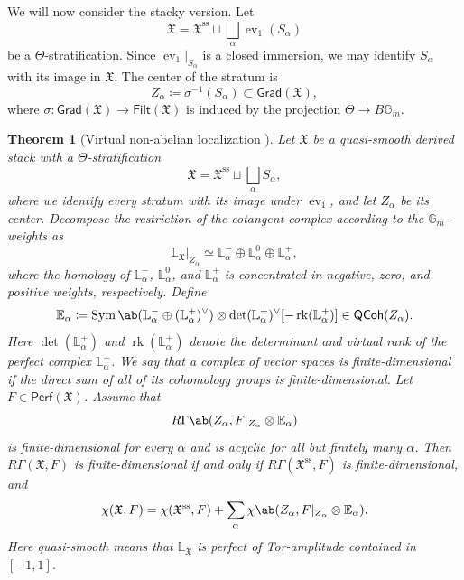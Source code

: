 \documentclass{amsart}
\newtheorem{thm}{Theorem}[section]
\theoremstyle{definition}
\theoremstyle{remark}
\theoremstyle{plain}
\theoremstyle{definition}
\theoremstyle{remark}
\newcommand{\G}{\mathbb{G}}
\newcommand{\E}{\mathbb{E}}
\renewcommand{\L}{\mathbb{L}}
\newcommand{\mf}[1]{\mathfrak{#1}}
\newcommand{\mr}[1]{\mathrm{#1}}
\newcommand{\on}[1]{\operatorname{#1}}
\newcommand{\ms}[1]{\mathsf{#1}}
\newcommand{\1}{\mathbf{1}}
\newcommand{\2}{\mathbf{2}}
\newcommand{\3}{\mathbf{3}}
\DeclareMathOperator{\ev}{ev}
\begin{document}
We will now consider the stacky version. Let
\[
    \mf{X}
    =
    \mf{X}^{\mr{ss}}
    \sqcup
    \bigsqcup_\alpha\ev_1(S_\alpha)
\]
be a \(\Theta\)-stratification. Since \(\ev_1|_{S_\alpha}\) is a closed immersion, we may identify \(S_\alpha\) with its image in \(\mf{X}\). The center of the stratum is
\[
    Z_\alpha\coloneqq\sigma^{-1}(S_\alpha)\subset\ms{Grad}(\mf{X}),
\]
where \(\sigma\colon\ms{Grad}(\mf{X})\to\ms{Filt}(\mf{X})\) is induced by the projection \(\Theta\to B\G_m\).

\begin{thm}[Virtual non-abelian localization {\cite[Theorem~5.1]{HLlocalization}}]
    Let \(\mf{X}\) be a quasi-smooth derived stack with a \(\Theta\)-stratification
    \[
        \mf{X}
        =
        \mf{X}^{\mr{ss}}
        \sqcup
        \bigsqcup_\alpha S_\alpha,
    \]
    where we identify every stratum with its image under \(\ev_1\), and let \(Z_\alpha\) be its center. Decompose the restriction of the cotangent complex according to the \(\G_m\)-weights as
    \[
        \L_{\mf{X}}|_{Z_\alpha}
        \simeq
        \L_\alpha^-
        \oplus
        \L_\alpha^0
        \oplus
        \L_\alpha^+,
    \]
    where the homology of \(\L_\alpha^-\), \(\L_\alpha^0\), and \(\L_\alpha^+\) is concentrated in negative, zero, and positive weights, respectively. Define
    \[
        \E_\alpha
        \coloneqq
        \on{Sym}\ab(
            \L_\alpha^-
            \oplus
            (\L_\alpha^+)^\vee
        )
        \otimes
        \det(\L_\alpha^+)^\vee
        [-\on{rk}(\L_\alpha^+)]
        \in
        \ms{QCoh}(Z_\alpha).
    \]
    Here \(\det(\L_\alpha^+)\) and \(\on{rk}(\L_\alpha^+)\) denote the determinant and virtual rank of the perfect complex \(\L_\alpha^+\). We say that a complex of vector spaces is finite-dimensional if the direct sum of all of its cohomology groups is finite-dimensional.
    Let \(F\in\ms{Perf}(\mf{X})\). Assume that
    \[
        R\Gamma\ab(
            Z_\alpha,
            F|_{Z_\alpha}\otimes\E_\alpha
        )
    \]
    is finite-dimensional for every \(\alpha\) and is acyclic for all but finitely many \(\alpha\). Then \(R\Gamma(\mf{X},F)\) is finite-dimensional if and only if \(R\Gamma(\mf{X}^{\mr{ss}},F)\) is finite-dimensional, and
    \[
        \chi(\mf{X},F)
        =
        \chi(\mf{X}^{\mr{ss}},F)
        +
        \sum_\alpha
        \chi\ab(
            Z_\alpha,
            F|_{Z_\alpha}\otimes\E_\alpha
        ).
    \]
    Here quasi-smooth means that \(\L_{\mf{X}}\) is perfect of Tor-amplitude contained in \([-1,1]\).
\end{thm}
\end{document}
